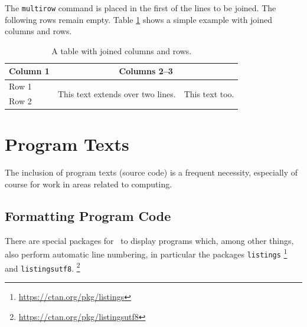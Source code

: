 The \verb|multirow| command is placed in the first of the lines to be joined.
The following rows remain empty. Table \ref{tab:multi-column-row-table} shows
a simple example with joined columns and rows.


\begin{table}[htbp]
    \caption{A table with joined columns and rows.}
    \label{tab:multi-column-row-table}
    \centering
    \setlength{\tabcolsep}{10pt} %
    \renewcommand{\arraystretch}{1.25}      %
    \begin{tabular}{@{}lll@{}}
        \toprule
        Column 1 & \multicolumn{2}{c}{Columns 2--3} \\
        \midrule
        Row 1 &
        \multirow{2}{4cm}{This text extends over two lines.} &
        \multirow{2}{*}{This text too.} \\
        Row 2 & & \\
        \bottomrule
    \end{tabular}
\end{table}


\section{Program Texts}
\label{sec:program-texts}

The inclusion of program texts (source code) is a frequent necessity,
especially of course for work in areas related to computing.

\subsection{Formatting Program Code}
\label{sec:FormattingProgramCode}

There are special packages for \latex\ to display programs which, among other
things, also perform automatic line numbering, in particular the packages
\texttt{listings}%
\footnote{\url{https://ctan.org/pkg/listings}}
and \texttt{listingsutf8}.%
\footnote{\url{https://ctan.org/pkg/listingsutf8}}


